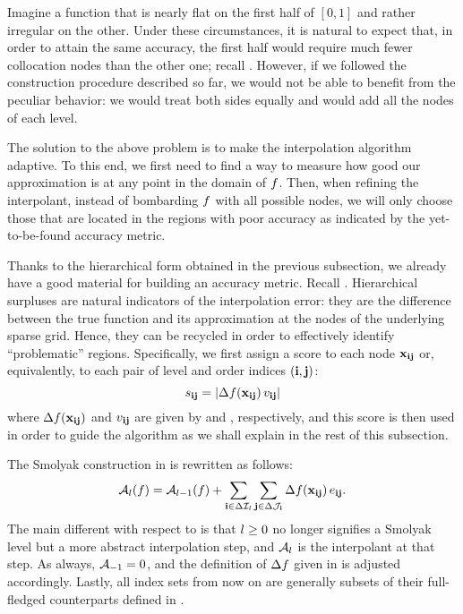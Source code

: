 Imagine a function that is nearly flat on the first half of $[0, 1]$ and rather
irregular on the other. Under these circumstances, it is natural to expect that,
in order to attain the same accuracy, the first half would require much fewer
collocation nodes than the other one; recall . However, if we
followed the construction procedure described so far, we would not be able to
benefit from the peculiar behavior: we would treat both sides equally and would
add all the nodes of each level.

The solution to the above problem is to make the interpolation algorithm
adaptive. To this end, we first need to find a way to measure how good our
approximation is at any point in the domain of $f$. Then, when refining the
interpolant, instead of bombarding $f$ with all possible nodes, we will only
choose those that are located in the regions with poor accuracy as indicated by
the yet-to-be-found accuracy metric.

Thanks to the hierarchical form obtained in the previous subsection, we already
have a good material for building an accuracy metric. Recall .
Hierarchical surpluses are natural indicators of the interpolation error: they
are the difference between the true function and its approximation at the nodes
of the underlying sparse grid. Hence, they can be recycled in order to
effectively identify ``problematic'' regions. Specifically, we first assign a
score to each node $\mathbf{x}_{\mathbf{i}\mathbf{j}}$ or, equivalently, to each pair of level and
order indices $(\mathbf{i}, \mathbf{j})$:
\begin{equation} \elab{score}
  \score_{\vi\vj} = \left| \surplus(\vx_{\vi\vj}) \, \w_{\vi\vj} \right|
\end{equation}
where $\Delta f(\mathbf{x}_{\mathbf{i}\mathbf{j}})$ and $v_{\mathbf{i}\mathbf{j}}$ are given by  and
, respectively, and this score is then used in order to guide the
algorithm as we shall explain in the rest of this subsection.

The Smolyak construction in  is rewritten as follows:
\begin{equation} \elab{approximation}
  \approximation{\l}(\f) = \approximation{\l-1}(\f) + \sum_{\vi \in \Delta\lindex_\l} \sum_{\vj \in \Delta\oindex_\vi} \surplus(\vx_{\vi\vj}) \,
\e_{\vi\vj}.
\end{equation}
The main different with respect to  is that $l \geq
0$ no longer signifies a Smolyak level but a more abstract interpolation step,
and $\mathcal{A}_{l}$ is the interpolant at that step. As always,
$\mathcal{A}_{-1} = 0$, and the definition of $\Delta f$ given in
 is adjusted accordingly. Lastly, all index sets from now on are
generally subsets of their full-fledged counterparts defined in
.

